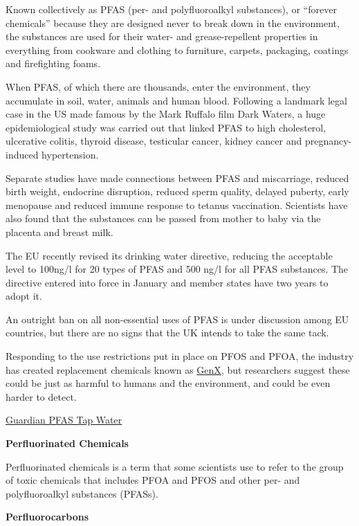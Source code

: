 \documentclass[
]{book}
\begin{document}
Known collectively as PFAS (per- and polyfluoroalkyl substances), or ``forever chemicals'' because they are designed never to break down in the environment, the substances are used for their water- and grease-repellent properties in everything from cookware and clothing to furniture, carpets, packaging, coatings and firefighting foams.

When PFAS, of which there are thousands, enter the environment, they accumulate in soil, water, animals and human blood. Following a landmark legal case in the US made famous by the Mark Ruffalo film Dark Waters, a huge epidemiological study was carried out that linked PFAS to high cholesterol, ulcerative colitis, thyroid disease, testicular cancer, kidney cancer and pregnancy-induced hypertension.

Separate studies have made connections between PFAS and miscarriage, reduced birth weight, endocrine disruption, reduced sperm quality, delayed puberty, early menopause and reduced immune response to tetanus vaccination. Scientists have also found that the substances can be passed from mother to baby via the placenta and breast milk.

The EU recently revised its drinking water directive, reducing the acceptable level to 100ng/l for 20 types of PFAS and 500 ng/l for all PFAS substances. The directive entered into force in January and member states have two years to adopt it.

An outright ban on all non-essential uses of PFAS is under discussion among EU countries, but there are no signs that the UK intends to take the same tack.

Responding to the use restrictions put in place on PFOS and PFOA, the industry has created replacement chemicals known as \href{https://www.endsreport.com/article/1589354/pfoa-replacement-deemed-substance-high-concern}{GenX}, but researchers suggest these could be just as harmful to humans and the environment, and could be even harder to detect.

\href{https://www.theguardian.com/environment/2021/mar/25/uk-flying-blind-on-levels-of-toxic-chemicals-in-tap-water}{Guardian PFAS Tap Water}

\textbf{Perfluorinated Chemicals}

Perfluorinated chemicals is a term that some scientists use to refer to the group of toxic chemicals that includes PFOA and PFOS and other per- and polyfluoroalkyl substances (PFASs).

\textbf{Perfluorocarbons}
\end{document}
